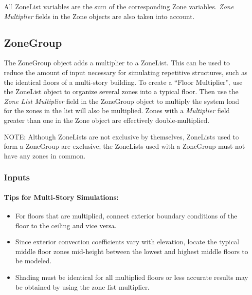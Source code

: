 All ZoneList variables are the sum of the corresponding Zone variables. \emph{Zone Multiplier} fields in the Zone objects are also taken into account.

\subsection{ZoneGroup}\label{zonegroup}

The ZoneGroup object adds a multiplier to a ZoneList. This can be used to reduce the amount of input necessary for simulating repetitive structures, such as the identical floors of a multi-story building. To create a ``Floor Multiplier'', use the ZoneList object to organize several zones into a typical floor. Then use the \emph{Zone List Multiplier} field in the ZoneGroup object to multiply the system load for the zones in the list will also be multiplied. Zones with a \emph{Multiplier} field greater than one in the Zone object are effectively double-multiplied.

\begin{callout}
NOTE: Although ZoneLists are not exclusive by themselves, ZoneLists used to form a ZoneGroup are exclusive; the ZoneLists used with a ZoneGroup must not have any zones in common.
\end{callout}

\subsubsection{Inputs}\label{inputs-2-042}

\paragraph{Tips for Multi-Story Simulations:}\label{tips-for-multi-story-simulations}

\begin{itemize}
\item
  For floors that are multiplied, connect exterior boundary conditions of the floor to the ceiling and vice versa.
\item
  Since exterior convection coefficients vary with elevation, locate the typical middle floor zones mid-height between the lowest and highest middle floors to be modeled.
\item
  Shading must be identical for all multiplied floors or less accurate results may be obtained by using the zone list multiplier.
\end{itemize}

